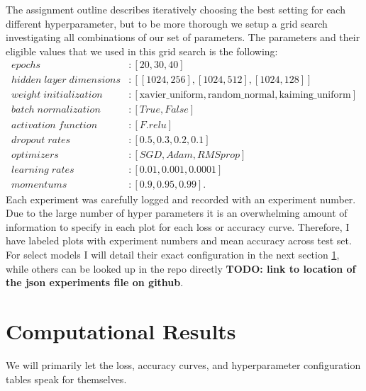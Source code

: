 \documentclass[10pt]{amsart}
\begin{document}
The assignment outline describes iteratively choosing the best setting for each different hyperparameter, but to be more thorough we setup a grid search investigating all combinations of our set of parameters.
The parameters and their eligible values that we used in this grid search is the following:
\begin{align*}
epochs &: [20, 30, 40] \\
hidden \; layer \; dimensions &: [[1024, 256], [1024, 512], [1024, 128]] \\
weight \; initialization &: [\text{xavier\_uniform}, \text{random\_normal}, \text{kaiming\_uniform}] \\
batch \; normalization &: [True, False] \\
activation \; function &: [F.relu] \\
dropout \; rates &: [0.5, 0.3, 0.2, 0.1] \\
optimizers &: [SGD, Adam, RMSprop] \\
learning \; rates &: [0.01, 0.001, 0.0001] \\
momentums &: [0.9, 0.95, 0.99].
\end{align*}
Each experiment was carefully logged and recorded with an experiment number.
Due to the large number of hyper parameters it is an overwhelming amount of information to specify in each plot for each loss or accuracy curve.
Therefore, I have labeled plots with experiment numbers and mean accuracy across test set.
For select models I will detail their exact configuration in the next section \ref{sec:results}, while others can be looked up in the repo directly \textbf{TODO: link to location of the json experiments file on github}.

\section{Computational Results}\label{sec:results}
We will primarily let the loss, accuracy curves, and hyperparameter configuration tables speak for themselves.
\end{document}
